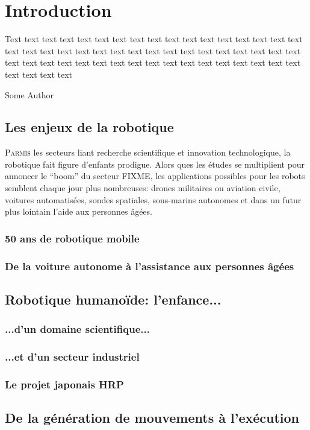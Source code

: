 \chapter{Introduction}
\label{chap:intro}

\epigraph{Text text text text text text text text text text text text
  text text text text text text text text text text text text text
  text text text text text text text text text text text text text
  text text text text text text text text text text text text text
  text text text text}{Some Author}
\clearpage

\section{Les enjeux de la robotique}

\lettrine[lines=2, lraise=0.1, nindent=0em, slope=-.5em]%
{P}{armis} les secteurs liant recherche scientifique et innovation
technologique, la robotique fait figure d'enfants prodigue. Alors ques
les études se multiplient pour annoncer le ``boom'' du secteur FIXME,
les applications possibles pour les robots semblent chaque jour plus
nombreuses: drones militaires ou aviation civile, voitures
automatisées, sondes spatiales, sous-marins autonomes et dans un futur
plus lointain l'aide aux personnes âgées.

\subsection{50 ans de robotique mobile}
\subsection{De la voiture autonome à l'assistance aux personnes âgées}

\section{Robotique humanoïde: l'enfance...}

\subsection{...d'un domaine scientifique...}
\subsection{...et d'un secteur industriel}

\subsection{Le projet japonais HRP}

\section{De la génération de mouvements à l'exécution}

